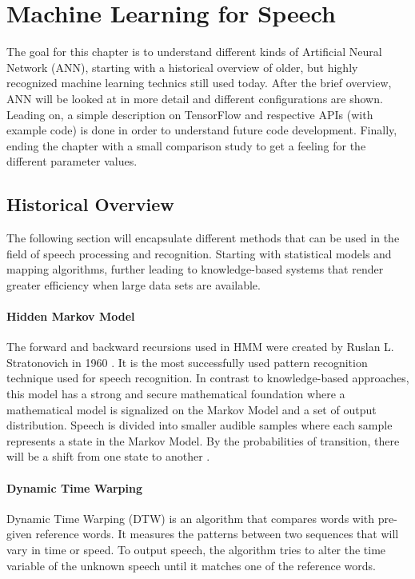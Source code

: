 \chapter{Machine Learning for Speech}\label{ch:machine_learning}
The goal for this chapter is to understand different kinds of Artificial Neural Network (ANN), starting with a historical overview of older, but highly recognized machine learning technics still used today. After the brief overview, ANN will be looked at in more detail and different configurations are shown. Leading on, a simple description on TensorFlow and respective APIs (with example code) is done in order to understand future code development. Finally, ending the chapter with a small comparison study to get a feeling for the different parameter values.

\section{Historical Overview}
The following section will encapsulate different methods that 
can be used in the field of speech processing and recognition.
Starting with statistical models and mapping algorithms,
further leading to knowledge-based systems that render greater
efficiency when large data sets are available.

\subsubsection{Hidden Markov Model}

The forward and backward recursions used in HMM  were
created by Ruslan L. Stratonovich in 1960
\cite{stratonovich1960conditional}.
It is the most successfully used pattern recognition technique used for speech recognition.
In contrast to knowledge-based approaches, this model has
a strong and secure mathematical foundation
where a mathematical model is signalized on the Markov
Model and a set of output distribution. Speech is divided
into smaller audible samples where each sample represents a state in the Markov Model. 
By the probabilities of transition, there will be a shift from one state to another
\cite[p.~2]{gaikwad2010review}\cite{togneri1990speech}.

\subsubsection{Dynamic Time Warping}

Dynamic Time Warping (DTW) is an algorithm that compares words with pre-given reference words.
It measures the patterns between two sequences that will vary in time or speed.\cite{togneri1990speech}
To output speech, the algorithm tries to alter the time variable of the unknown speech until it matches one of the reference words.

